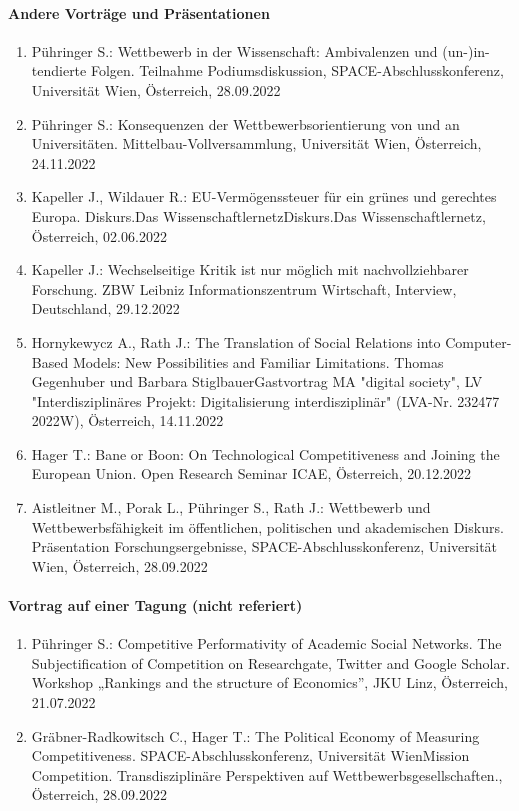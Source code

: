 \paragraph{Andere Vorträge und Präsentationen}
\begin{enumerate}
	\item Pühringer S.: Wettbewerb in der Wissenschaft: Ambivalenzen und (un-)in-tendierte Folgen. Teilnahme Podiumsdiskussion, SPACE-Abschlusskonferenz, Universität Wien, Österreich, 28.09.2022
	\item Pühringer S.: Konsequenzen der Wettbewerbsorientierung von und an Universitäten. Mittelbau-Vollversammlung, Universität Wien, Österreich, 24.11.2022
	\item Kapeller J., Wildauer R.: EU-Vermögenssteuer für ein grünes und gerechtes Europa. Diskurs.Das WissenschaftlernetzDiskurs.Das Wissenschaftlernetz, Österreich, 02.06.2022
	\item Kapeller J.: Wechselseitige Kritik ist nur möglich mit nachvollziehbarer Forschung. ZBW Leibniz Informationszentrum Wirtschaft, Interview, Deutschland, 29.12.2022
	\item Hornykewycz A., Rath J.: The Translation of Social Relations into Computer-Based Models: New Possibilities and Familiar Limitations. Thomas Gegenhuber und Barbara StiglbauerGastvortrag MA "digital society", LV "Interdisziplinäres Projekt: Digitalisierung interdisziplinär" (LVA-Nr. 232477 2022W), Österreich, 14.11.2022
	\item Hager T.: Bane or Boon: On Technological Competitiveness and Joining the European Union. Open Research Seminar ICAE, Österreich, 20.12.2022
	\item Aistleitner M., Porak L., Pühringer S., Rath J.: Wettbewerb und Wettbewerbsfähigkeit im öffentlichen, politischen und akademischen Diskurs. Präsentation Forschungsergebnisse, SPACE-Abschlusskonferenz, Universität Wien, Österreich, 28.09.2022
\end{enumerate}
\paragraph{Vortrag auf einer Tagung (nicht referiert)}
\begin{enumerate}
	\item Pühringer S.: Competitive Performativity of Academic Social Networks. The Subjectification of Competition on Researchgate, Twitter and Google Scholar. Workshop „Rankings and the structure of Economics”, JKU Linz, Österreich, 21.07.2022
	\item Gräbner-Radkowitsch C., Hager T.: The Political Economy of Measuring Competitiveness. SPACE-Abschlusskonferenz, Universität WienMission Competition. Transdisziplinäre Perspektiven auf Wettbewerbsgesellschaften., Österreich, 28.09.2022
\end{enumerate}
